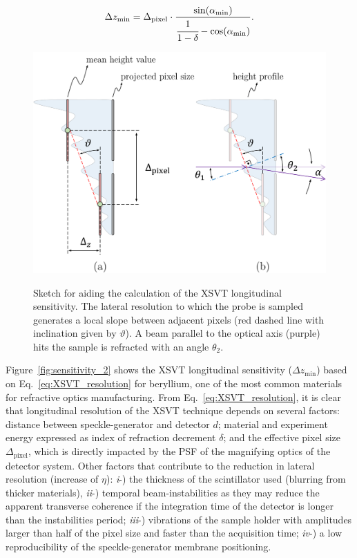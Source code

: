 \begin{refsection}
\begin{align}\label{eq:XSVT_resolution}
\Delta{z_{\text{min}}}=\Delta_\text{pixel}\cdot\frac{\sin(\alpha_\text{min})}{\cfrac{1}{1-\delta}-\cos(\alpha_\text{min})}.
\end{align}
\begin{figure}[ht]
        \centering
        {\includegraphics[width=0.5\linewidth]{figures/ch04b/sensitivity.pdf}}
        \caption[XSVT sensitivity calculation sketch]{Sketch for aiding the calculation of the XSVT longitudinal sensitivity. The lateral resolution to which the probe is sampled generates a local slope between adjacent pixels (red dashed line with inclination given by $\vartheta$). A beam parallel to the optical axis (purple) hits the sample is refracted with an angle $\theta_2$.}\label{fig:sensitivity}
\end{figure}
Figure~\ref{fig:sensitivity_2} shows the XSVT longitudinal sensitivity ($\Delta{z_{\text{min}}}$) based on Eq.~\ref{eq:XSVT_resolution} for beryllium, one of the most common materials for refractive optics manufacturing. From Eq.~\ref{eq:XSVT_resolution}, it is clear that longitudinal resolution of the XSVT technique depends on several factors: distance between speckle-generator and detector $d$; material and experiment energy expressed as index of refraction decrement $\delta$; and the effective pixel size $\Delta_\text{pixel}$, which is directly impacted by the PSF of the magnifying optics of the detector system. Other factors that contribute to the reduction in lateral resolution (increase of $\eta$): \textit{i}-) the thickness of the scintillator used (blurring from thicker materials), \textit{ii}-) temporal beam-instabilities as they may reduce the apparent transverse coherence if the integration time of the detector is longer than the instabilities period; \textit{iii}-) vibrations of the sample holder with amplitudes larger than half of the pixel size and faster than the acquisition time; \textit{iv}-) a low reproducibility of the speckle-generator membrane positioning.


\end{refsection}
